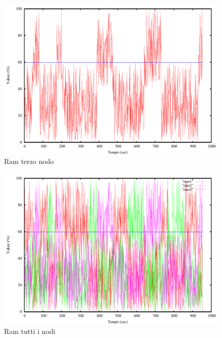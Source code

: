 \begin{figure}[H]
\begin{center}
\includegraphics[scale=0.6]{etc/ram3.pdf}
\caption{Ram terzo nodo}
\label{fig:ram3}
\end{center}
\end{figure}
\begin{figure}[H]
\begin{center}
\includegraphics[scale=0.6]{etc/ram.pdf}
\caption{Ram tutti i nodi}
\label{fig:ram}
\end{center}
\end{figure}

